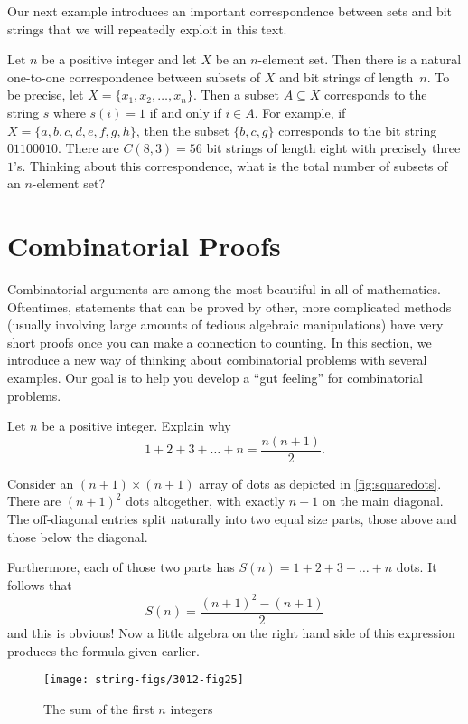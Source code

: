 Our next example introduces an important correspondence between sets
and bit strings that we will repeatedly exploit in this text.

\begin{example}
  Let $n$ be a positive integer and let $X$ be an $n$-element set.
  Then there is a natural one-to-one correspondence between subsets of
  $X$ and bit strings of length~$n$.  To be precise, let
  $X=\{x_1,x_2,\dots,x_n\}$.  Then a subset $A\subseteq X$ corresponds
  to the string $s$ where $s(i) = 1$ if and only if $i\in A$.  For
  example, if $X=\{a,b,c,d,e,f,g,h\}$, then the subset $\{b,c,g\}$
  corresponds to the bit string $01100010$. There are $C(8,3)=56$ bit
  strings of length eight with precisely three $1$'s. Thinking about
  this correspondence, what is the total number of subsets of an
  $n$-element set?
\end{example}

\section{Combinatorial Proofs}\label{s:strings:comb-proof}

Combinatorial arguments are among the most beautiful in all of
mathematics. Oftentimes, statements that can be proved by other,
more complicated methods (usually involving large amounts of tedious algebraic
manipulations) have very short proofs once you can make a connection
to counting. In this section, we introduce a new way of thinking about
combinatorial problems with several examples. Our goal is to help you
develop a ``gut feeling'' for combinatorial problems.

\begin{example}
Let $n$ be a positive integer. Explain why
\[
1+2+3+\dots+n=\frac{n(n+1)}{2}.
\]

Consider an $(n+1)\times (n+1)$ array of dots as depicted
in \autoref{fig:squaredots}.  There are 
$(n+1)^2$ dots altogether, with exactly $n+1$
on the main diagonal.  
The off-diagonal entries split
naturally into two equal size parts, those above and
those below the diagonal.  

Furthermore, each of those
two parts has $S(n)=1+2+3+\dots+n$ dots.
It follows that
\[
S(n)=\frac{(n+1)^2-(n+1)}{2}
\]
and this is obvious! Now a little algebra on the right
hand side of this expression produces the formula given
earlier.

\end{example}

\begin{figure}
\begin{center}
\texttt{[image: string-figs/3012-fig25]}\\
\caption{The sum of the first $n$ integers}
\label{fig:squaredots}
\end{center}
\end{figure}


